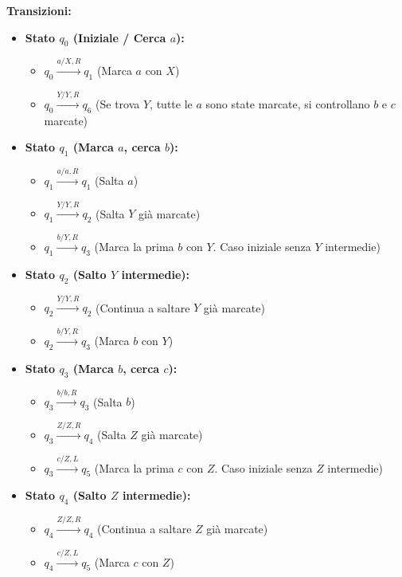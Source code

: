 \documentclass[a4paper]{article}
\theoremstyle{definition} %
\begin{document}
\noindent \textbf{Transizioni:}
\begin{itemize}
    \item \textbf{Stato $q_0$ (Iniziale / Cerca $a$):}
        \begin{itemize}
            \item $q_0 \xrightarrow{a / X, R} q_1$ (Marca $a$ con $X$)
            \item $q_0 \xrightarrow{Y / Y, R} q_6$ (Se trova $Y$, tutte le $a$ sono state marcate, si controllano $b$ e $c$ marcate)
        \end{itemize}
    \item \textbf{Stato $q_1$ (Marca $a$, cerca $b$):}
        \begin{itemize}
            \item $q_1 \xrightarrow{a / a, R} q_1$ (Salta $a$)
            \item $q_1 \xrightarrow{Y / Y, R} q_2$ (Salta $Y$ già marcate)
            \item $q_1 \xrightarrow{b / Y, R} q_3$ (Marca la prima $b$ con $Y$. Caso iniziale senza $Y$ intermedie)
        \end{itemize}
    \item \textbf{Stato $q_2$ (Salto $Y$ intermedie):}
        \begin{itemize}
            \item $q_2 \xrightarrow{Y / Y, R} q_2$ (Continua a saltare $Y$ già marcate)
            \item $q_2 \xrightarrow{b / Y, R} q_3$ (Marca $b$ con $Y$)
        \end{itemize}
    \item \textbf{Stato $q_3$ (Marca $b$, cerca $c$):}
        \begin{itemize}
            \item $q_3 \xrightarrow{b / b, R} q_3$ (Salta $b$)
            \item $q_3 \xrightarrow{Z / Z, R} q_4$ (Salta $Z$ già marcate)
            \item $q_3 \xrightarrow{c / Z, L} q_5$ (Marca la prima $c$ con $Z$. Caso iniziale senza $Z$ intermedie)
        \end{itemize}
    \item \textbf{Stato $q_4$ (Salto $Z$ intermedie):}
        \begin{itemize}
            \item $q_4 \xrightarrow{Z / Z, R} q_4$ (Continua a saltare $Z$ già marcate)
            \item $q_4 \xrightarrow{c / Z, L} q_5$ (Marca $c$ con $Z$)

\end{itemize}
\end{itemize}
\end{document}

